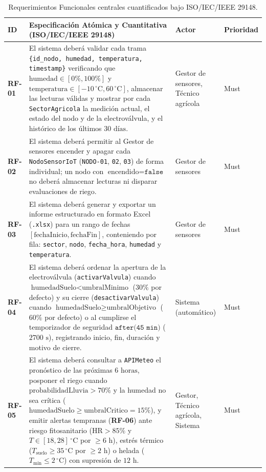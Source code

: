 \documentclass[12pt,letterpaper]{report}
\begin{document}
\begin{table}[H]
    \centering
    \small
    \renewcommand{\arraystretch}{1.3}
    \begin{tabularx}{\linewidth}{|L{1.3cm}|Y|L{2.3cm}|L{1.6cm}|}
        \hline
        \textbf{ID} & \textbf{Especificación Atómica y Cuantitativa (ISO/IEC/IEEE 29148)} & \textbf{Actor} & \textbf{Prioridad} \\
        \hline
        \textbf{RF-01} & El sistema deberá validar cada trama \texttt{\{id\_nodo, humedad, temperatura, timestamp\}} verificando que $\text{humedad} \in [0\%, 100\%]$ y $\text{temperatura} \in [-10\,^\circ\text{C}, 60\,^\circ\text{C}]$, almacenar las lecturas válidas y mostrar por cada \texttt{SectorAgricola} la medición actual, el estado del nodo y de la electroválvula, y el histórico de los últimos $30\text{ días}$. & Gestor de sensores, Técnico agrícola & Must \\
        \hline
        \textbf{RF-02} & El sistema deberá permitir al Gestor de sensores encender y apagar cada \texttt{NodoSensorIoT} (\texttt{NODO-01}, \texttt{02}, \texttt{03}) de forma individual; un nodo con $\text{encendido} = \texttt{false}$ no deberá almacenar lecturas ni disparar evaluaciones de riego. & Gestor de sensores & Must \\
        \hline
        \textbf{RF-03} & El sistema deberá generar y exportar un informe estructurado en formato Excel (\texttt{.xlsx}) para un rango de fechas $[\text{fechaInicio}, \text{fechaFin}]$, conteniendo por fila: \texttt{sector}, \texttt{nodo}, \texttt{fecha\_hora}, \texttt{humedad} y \texttt{temperatura}. & Gestor de sensores & Must \\
        \hline
        \textbf{RF-04} & El sistema deberá ordenar la apertura de la electroválvula (\texttt{activarValvula}) cuando $\text{humedadSuelo} < \text{umbralMinimo}$ ($30\%$ por defecto) y su cierre (\texttt{desactivarValvula}) cuando $\text{humedadSuelo} \ge \text{umbralObjetivo}$ ($60\%$ por defecto) o al cumplirse el temporizador de seguridad $\texttt{after(45 min)}$ ($2700\text{ s}$), registrando inicio, fin, duración y motivo de cierre. & Sistema (automático) & Must \\
        \hline
        \textbf{RF-05} & El sistema deberá consultar a \texttt{APIMeteo} el pronóstico de las próximas $6\text{ horas}$, posponer el riego cuando $\text{probabilidadLluvia} > 70\%$ y la humedad no sea crítica ($\text{humedadSuelo} \ge \text{umbralCritico} = 15\%$), y emitir alertas tempranas (\textbf{RF-06}) ante riesgo fitosanitario ($\text{HR} > 85\%$ y $T \in [18, 28]\,^\circ\text{C}$ por $\ge 6\text{ h}$), estrés térmico ($T_{\text{suelo}} \ge 35\,^\circ\text{C}$ por $\ge 2\text{ h}$) o helada ($T_{\min} \le 2\,^\circ\text{C}$) con supresión de $12\text{ h}$. & Gestor, Técnico agrícola, Sistema & Must \\
        \hline
    \end{tabularx}
    \caption{Requerimientos Funcionales centrales cuantificados bajo ISO/IEC/IEEE 29148.}
    \label{tab:rf-sintesis}
\end{table}
\end{document}

